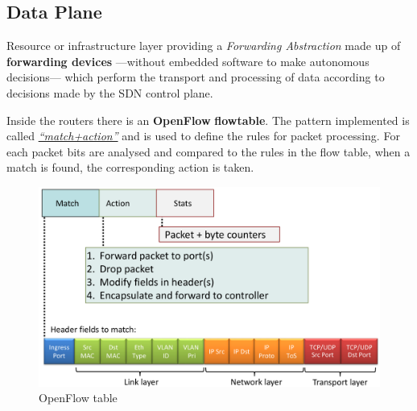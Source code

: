 \newpage
\subsection{Data Plane}
Resource or infrastructure layer providing a \textit{Forwarding Abstraction} made up of \textbf{forwarding devices} ---without embedded software to make autonomous decisions--- which perform the transport and processing of data according to decisions made by the SDN control plane.

\begin{paracol}{2}
   
   \colfill
   Inside the routers there is an \textbf{OpenFlow} \textbf{flow\footnotemark[1] table}.
   The pattern implemented is called \ul{\textit{``match+action''}} and is used to define the rules for packet processing. For each packet bits are analysed and compared to the rules in the flow table, when a match is found, the corresponding action is taken.
   \colfill
   \switchcolumn
   \begin{figure}[htbp]
   \centering
   \includegraphics{images/openflow_table.png}
   \caption{OpenFlow table}
   \label{fig:openflow_table}
   \end{figure}
\end{paracol}

